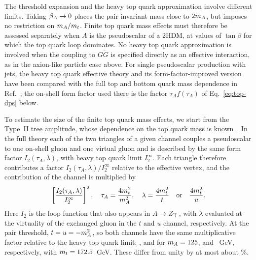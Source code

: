The threshold expansion and the heavy top quark
approximation involve different limits. Taking
$\beta_A\to0$ places the pair invariant mass close to
$2m_A$, but imposes no restriction on $m_A/m_t$.
Finite top quark mass effects must therefore be
assessed separately when $A$ is the pseudoscalar of a 2HDM,
at values of $\tan\beta$ for which the top quark loop dominates.
No heavy top quark approximation is involved when
the coupling to $G\tilde G$ is specified directly
as an effective interaction, as in the axion-like
particle case above.
For single pseudoscalar production with jets, the heavy top quark effective theory and its form-factor-improved version have been compared with the full top and bottom quark mass dependence in Ref.~\cite{Bhattacharya:2026ucv}; the on-shell form factor used there is the factor $\tau_Af(\tau_A)$ of Eq.~\eqref{eq:top-dps} below.

To estimate the size of the finite top quark mass effects, we start from the Type~II tree amplitude, whose dependence on the top quark mass is known~\cite{Baglio:2023euv}. In the full theory each of the two triangles of a given channel couples a pseudoscalar to one on-shell gluon and one virtual gluon and is described by the same form factor $I_2(\tau_A,\lambda)$, with heavy top quark limit $I_2^\infty$. Each triangle therefore contributes a factor $I_2(\tau_A,\lambda)/I_2^\infty$ relative to the effective vertex, and the contribution of the channel is multiplied by
\begin{equation}
 \left[
 \frac{I_2(\tau_A,\lambda)}{I_2^\infty}
 \right]^2,
 \quad
 \tau_A=\frac{4m_t^2}{m_A^2},
 \quad
 \lambda=\frac{4m_t^2}{t}
 \quad\text{or}\quad
 \frac{4m_t^2}{u}.
 \label{eq:top-tree}
\end{equation}
Here $I_2$ is the loop function that also appears
in $A\to Z\gamma$ \cite{Baglio:2023euv}, with $\lambda$ evaluated at the virtuality of the exchanged gluon in the $t$ and $u$ channel, respectively.
At the pair threshold, $t=u=-m_A^2$, so both channels
have the same multiplicative factor relative to the heavy
top quark limit: \TopMassRatioA, \TopMassRatioB{} and \TopMassRatioC{} for $m_A=125$, \TopMassMAB{} and \TopMassMAC~GeV, respectively, with $m_t=172.5$~GeV. These differ from unity by at most about \TopMassPercentMax\%.

